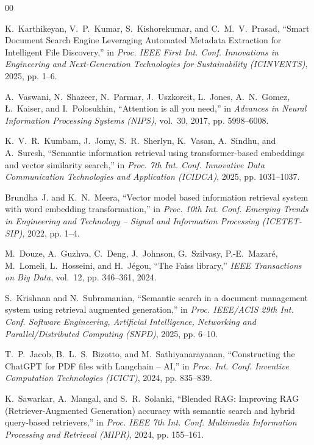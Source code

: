 \documentclass[conference]{IEEEtran}
\begin{document}

\begin{thebibliography}{00}
\fontsize{6.6pt}{7.6pt}\selectfont
\setlength{\itemsep}{0pt plus 0.2pt minus 0.1pt}
\setlength{\parskip}{0pt}
\setlength{\parsep}{0pt}

K.~Karthikeyan, V.~P.~Kumar, S.~Kishorekumar, and C.~M.~V.~Prasad, ``Smart Document Search Engine Leveraging Automated Metadata Extraction for Intelligent File Discovery,'' in \emph{Proc. IEEE First Int. Conf. Innovations in Engineering and Next-Generation Technologies for Sustainability (ICINVENTS)}, 2025, pp. 1--6.

A.~Vaswani, N.~Shazeer, N.~Parmar, J.~Uszkoreit, L.~Jones, A.~N.~Gomez, {\L}.~Kaiser, and I.~Polosukhin, ``Attention is all you need,'' in \emph{Advances in Neural Information Processing Systems (NIPS)}, vol.~30, 2017, pp. 5998--6008.

K.~V.~R.~Kumbam, J.~Jomy, S.~R.~Sherlyn, K.~Vasan, A.~Sindhu, and A.~Suresh, ``Semantic information retrieval using transformer-based embeddings and vector similarity search,'' in \emph{Proc. 7th Int. Conf. Innovative Data Communication Technologies and Application (ICIDCA)}, 2025, pp. 1031--1037.

Brundha~J. and K.~N.~Meera, ``Vector model based information retrieval system with word embedding transformation,'' in \emph{Proc. 10th Int. Conf. Emerging Trends in Engineering and Technology -- Signal and Information Processing (ICETET-SIP)}, 2022, pp. 1--4.

M.~Douze, A.~Guzhva, C.~Deng, J.~Johnson, G.~Szilvasy, P.-E.~Mazar{\'e}, M.~Lomeli, L.~Hosseini, and H.~J{\'e}gou, ``The Faiss library,'' \emph{IEEE Transactions on Big Data}, vol.~12, pp. 346--361, 2024.

S.~Krishnan and N.~Subramanian, ``Semantic search in a document management system using retrieval augmented generation,'' in \emph{Proc. IEEE/ACIS 29th Int. Conf. Software Engineering, Artificial Intelligence, Networking and Parallel/Distributed Computing (SNPD)}, 2025, pp. 6--10.

T.~P.~Jacob, B.~L.~S.~Bizotto, and M.~Sathiyanarayanan, ``Constructing the ChatGPT for PDF files with Langchain -- AI,'' in \emph{Proc. Int. Conf. Inventive Computation Technologies (ICICT)}, 2024, pp. 835--839.

K.~Sawarkar, A.~Mangal, and S.~R.~Solanki, ``Blended RAG: Improving RAG (Retriever-Augmented Generation) accuracy with semantic search and hybrid query-based retrievers,'' in \emph{Proc. IEEE 7th Int. Conf. Multimedia Information Processing and Retrieval (MIPR)}, 2024, pp. 155--161.


\end{thebibliography}
\end{document}
